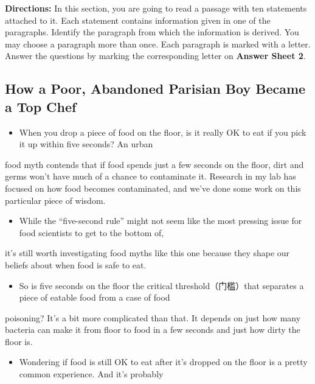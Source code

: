 \documentclass[UTF8,11pt]{ctexart}
\begin{document}
\textbf{Directions:} In this section, you are going to read a passage with ten statements attached to it. Each statement contains information given in one of the paragraphs. Identify the paragraph from which the information is derived. You may choose a paragraph more than once. Each paragraph is marked with a letter. Answer the questions by marking the corresponding letter on\textbf{ Answer Sheet 2}.


\subsection*{\textbf{How a Poor, Abandoned Parisian Boy Became a Top Chef}}


\begin{itemize}[leftmargin=2em,itemsep=.2em,topsep=.4em]\item[A.] When you drop a piece of food on the floor, is it really OK to eat if you pick it up within five seconds? An urban
\end{itemize}

food myth contends that if food spends just a few seconds on the floor, dirt and germs won’t have much of a chance to contaminate it. Research in my lab has focused on how food becomes contaminated, and we’ve done some work on this particular piece of wisdom.


\begin{itemize}[leftmargin=2em,itemsep=.2em,topsep=.4em]\item[B.] While the “five-second rule” might not seem like the most pressing issue for food scientists to get to the bottom of,
\end{itemize}

it’s still worth investigating food myths like this one because they shape our beliefs about when food is safe to eat.


\begin{itemize}[leftmargin=2em,itemsep=.2em,topsep=.4em]\item[C.] So is five seconds on the floor the critical threshold（门槛）that separates a piece of eatable food from a case of food
\end{itemize}

poisoning? It’s a bit more complicated than that. It depends on just how many bacteria can make it from floor to food in a few seconds and just how dirty the floor is.


\begin{itemize}[leftmargin=2em,itemsep=.2em,topsep=.4em]\item[D.] Wondering if food is still OK to eat after it’s dropped on the floor is a pretty common experience. And it’s probably
\end{itemize}
\end{document}
